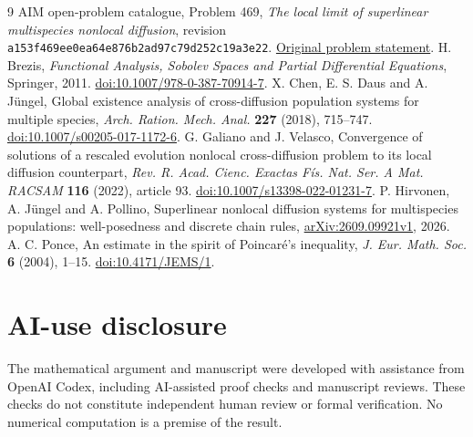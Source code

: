 \documentclass[11pt]{article}
\begin{document}
\begin{thebibliography}{9}
 AIM open-problem catalogue, Problem 469,
\emph{The local limit of superlinear multispecies nonlocal diffusion}, revision
\texttt{a153f469ee0ea64e876b2ad97c79d252c19a3e22}.
\href{https://github.com/MColbrook/AIM/blob/a153f469ee0ea64e876b2ad97c79d252c19a3e22/problems/469-superlinear-skt-nonlocal-to-local-limit.md}{Original problem statement}.
 H. Brezis, \emph{Functional Analysis, Sobolev Spaces and
Partial Differential Equations}, Springer, 2011.
\href{https://doi.org/10.1007/978-0-387-70914-7}{doi:10.1007/978-0-387-70914-7}.
 X. Chen, E. S. Daus and A. J\"ungel,
Global existence analysis of cross-diffusion population systems for multiple
species, \emph{Arch. Ration. Mech. Anal.} \textbf{227} (2018), 715--747.
\href{https://doi.org/10.1007/s00205-017-1172-6}{doi:10.1007/s00205-017-1172-6}.
 G. Galiano and J. Velasco, Convergence of solutions of a
rescaled evolution nonlocal cross-diffusion problem to its local diffusion
counterpart, \emph{Rev. R. Acad. Cienc. Exactas F\'is. Nat. Ser. A Mat.
RACSAM} \textbf{116} (2022), article 93.
\href{https://doi.org/10.1007/s13398-022-01231-7}{doi:10.1007/s13398-022-01231-7}.
 P. Hirvonen, A. J\"ungel and A. Pollino,
Superlinear nonlocal diffusion systems for multispecies populations:
well-posedness and discrete chain rules,
\href{https://arxiv.org/abs/2609.09921v1}{arXiv:2609.09921v1}, 2026.
 A. C. Ponce, An estimate in the spirit of Poincar\'e's
inequality, \emph{J. Eur. Math. Soc.} \textbf{6} (2004), 1--15.
\href{https://doi.org/10.4171/JEMS/1}{doi:10.4171/JEMS/1}.
\end{thebibliography}

\section*{AI-use disclosure}
The mathematical argument and manuscript were developed with assistance from
OpenAI Codex, including AI-assisted proof checks and manuscript reviews.
These checks do not constitute independent human review or formal verification.
No numerical computation is a premise of the result.
\end{document}
